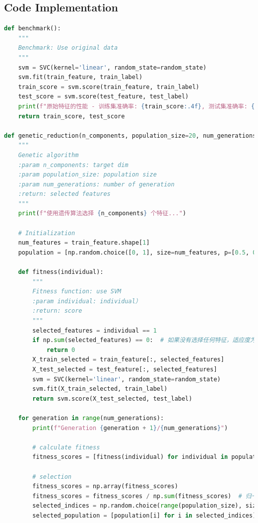 \documentclass[lang=cn]{elegantpaper}
\begin{document}
\subsection{Code Implementation}

\begin{lstlisting}[language=Python]
def benchmark():
    """
    Benchmark: Use original data
    """
    svm = SVC(kernel='linear', random_state=random_state)
    svm.fit(train_feature, train_label)
    train_score = svm.score(train_feature, train_label)
    test_score = svm.score(test_feature, test_label)
    print(f"原始特征的性能 - 训练集准确率: {train_score:.4f}, 测试集准确率: {test_score:.4f}")
    return train_score, test_score

def genetic_reduction(n_components, population_size=20, num_generations=10):
    """
    Genetic algorithm
    :param n_components: target dim
    :param population_size: population size
    :param num_generations: number of generation
    :return: selected features
    """
    print(f"使用遗传算法选择 {n_components} 个特征...")

    # Initialization
    num_features = train_feature.shape[1]
    population = [np.random.choice([0, 1], size=num_features, p=[0.5, 0.5]) for _ in range(population_size)]

    def fitness(individual):
        """
        Fitness function: use SVM 
        :param individual: individual）
        :return: score
        """
        selected_features = individual == 1
        if np.sum(selected_features) == 0:  # 如果没有选择任何特征，适应度为 0
            return 0
        X_train_selected = train_feature[:, selected_features]
        X_test_selected = test_feature[:, selected_features]
        svm = SVC(kernel='linear', random_state=random_state)
        svm.fit(X_train_selected, train_label)
        return svm.score(X_test_selected, test_label)

    for generation in range(num_generations):
        print(f"Generation {generation + 1}/{num_generations}")

        # calculate fitness
        fitness_scores = [fitness(individual) for individual in population]

        # selection
        fitness_scores = np.array(fitness_scores)
        fitness_scores = fitness_scores / np.sum(fitness_scores)  # 归一化
        selected_indices = np.random.choice(range(population_size), size=population_size, p=fitness_scores)
        selected_population = [population[i] for i in selected_indices]


\end{lstlisting}
\end{document}
